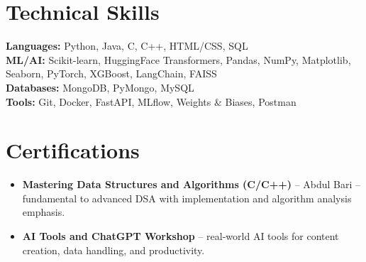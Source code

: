 \documentclass[11pt,a4paper]{article}
\begin{document}
\section*{Technical Skills}
\textbf{Languages:} Python, Java, C, C++, HTML/CSS, SQL \\
\textbf{ML/AI:} Scikit-learn, HuggingFace Transformers, Pandas, NumPy,
  Matplotlib, Seaborn, PyTorch, XGBoost, LangChain, FAISS \\
\textbf{Databases:} MongoDB, PyMongo, MySQL \\
\textbf{Tools:} Git, Docker, FastAPI, MLflow, Weights \& Biases, Postman

\section*{Certifications}
\begin{itemize}
  \item \textbf{Mastering Data Structures and Algorithms (C/C++)} --
        Abdul Bari -- fundamental to advanced DSA with
        implementation and algorithm analysis emphasis.
  \item \textbf{AI Tools and ChatGPT Workshop} -- real-world AI tools for
        content creation, data handling, and productivity.
\end{itemize}
\end{document}
